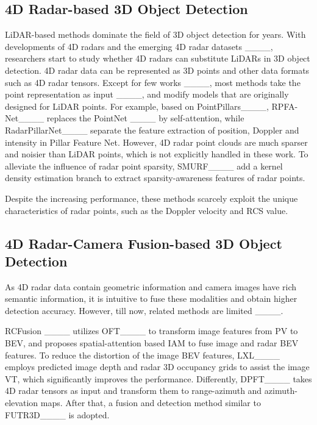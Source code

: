 \vspace{-3mm}
\subsection{4D Radar-based 3D Object Detection}

LiDAR-based methods dominate the field of 
3D object detection for years. With developments of 4D radars and the emerging 4D radar datasets ____, researchers start to study whether 4D radars can substitute LiDARs in 3D object detection. 
%
4D radar data can be represented as 3D points and other data formats such as 4D radar tensors. Except for few works ____, most methods take the point representation as input ____, and modify models that are originally designed for LiDAR points. For example, based on PointPillars____, RPFA-Net____ replaces the PointNet ____ by self-attention, while RadarPillarNet____ separate the feature extraction of position, Doppler and intensity in Pillar Feature Net. However, 4D radar point clouds are much sparser and noisier than LiDAR points, which is not explicitly handled in these work. To alleviate the influence of radar point sparsity, SMURF____ add a kernel density estimation branch to extract sparsity-awareness features of radar points. 

Despite the increasing performance, these methods scarcely exploit the unique characteristics of radar points, such as the Doppler velocity and RCS value. 

\vspace{-3mm}
\subsection{4D Radar-Camera Fusion-based 3D Object Detection}

As 4D radar data contain geometric information and camera images have rich semantic information, it is intuitive to fuse these modalities and obtain higher detection accuracy. However, till now,  related methods are limited ____.

RCFusion ____ utilizes OFT____ to transform image features from PV to BEV, and proposes spatial-attention based IAM to fuse image and radar BEV features. To reduce the distortion of the image BEV features, LXL____ employs predicted image depth and radar 3D occupancy grids to assist the image VT, which significantly improves the performance. Differently, DPFT____ takes 4D radar tensors as input and transform them to range-azimuth and azimuth-elevation maps. After that, a fusion and detection method similar to FUTR3D____ is adopted.

